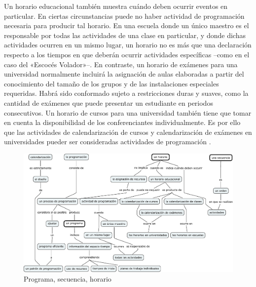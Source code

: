 \documentclass[draft,12pt,headsepline,footsepline,paper=letter]{scrreprt}
\begin{document}
Un horario educacional también muestra cuándo deben ocurrir eventos en particular. En ciertas circunstancias puede no haber actividad de programación necesaria para producir tal horario. En una escuela donde un único maestro es el responsable por todas las actividades de una clase en particular, y donde dichas actividades ocurren en un mismo lugar, un horario no es más que una declaración respecto a los tiempos en que deberán ocurrir actividades específicas –como en el caso del «Escocés Volador»–.
%
En contraste, un horario de exámenes para una universidad normalmente incluirá la asignación de aulas elaboradas a partir del conocimiento del tamaño de los grupos y de las instalaciones especiales requeridas. Habrá sido conformado sujeto a restricciones duras y suaves, como la cantidad de exámenes que puede presentar un estudiante en periodos consecutivos. Un horario de cursos para una universidad también tiene que tomar en cuenta la disponibilidad de los conferenciantes individualmente.
%
Es por ello que las actividades de calendarización de cursos y calendarización de exámenes en universidades pueder ser consideradas actividades de programación \citep[p.~49]{wren95scheduling-timetabling}. 

\begin{figure}
\includegraphics[width=\textwidth]{media/programa_secuencia_horario.pdf}
\caption[Programa, secuencia, horario]{Programa, secuencia, horario}
\label{fig:programa_secuencia_horario}
\end{figure}
\end{document}
